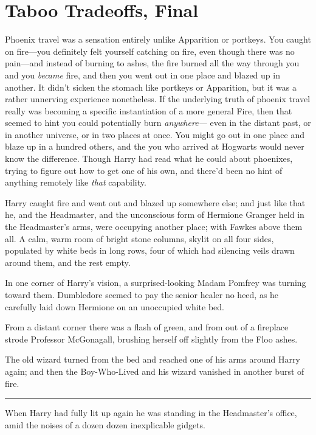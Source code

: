 \chapter{Taboo Tradeoffs, Final}

Phoenix travel was a sensation entirely unlike Apparition or portkeys.
You caught on fire---you definitely felt yourself catching on fire, even
though there was no pain---and instead of burning to ashes, the fire
burned all the way through you and you \emph{became} fire, and then you
went out in one place and blazed up in another. It didn't sicken the
stomach like portkeys or Apparition, but it was a rather unnerving
experience nonetheless. If the underlying truth of phoenix travel really
was becoming a specific instantiation of a more general Fire, then that
seemed to hint you could potentially burn \emph{anywhere---} even in the
distant past, or in another universe, or in two places at once. You
might go out in one place and blaze up in a hundred others, and the you
who arrived at Hogwarts would never know the difference. Though Harry
had read what he could about phoenixes, trying to figure out how to get
one of his own, and there'd been no hint of anything remotely like
\emph{that} capability.

Harry caught fire and went out and blazed up somewhere else; and just
like that he, and the Headmaster, and the unconscious form of Hermione
Granger held in the Headmaster's arms, were occupying another place;
with Fawkes above them all. A calm, warm room of bright stone columns,
skylit on all four sides, populated by white beds in long rows, four of
which had silencing veils drawn around them, and the rest empty.

In one corner of Harry's vision, a surprised-looking Madam Pomfrey was
turning toward them. Dumbledore seemed to pay the senior healer no heed,
as he carefully laid down Hermione on an unoccupied white bed.

From a distant corner there was a flash of green, and from out of a
fireplace strode Professor McGonagall, brushing herself off slightly
from the Floo ashes.

The old wizard turned from the bed and reached one of his arms around
Harry again; and then the Boy-Who-Lived and his wizard vanished in
another burst of fire.

\begin{center}\rule{3in}{0.4pt}\end{center}

When Harry had fully lit up again he was standing in the Headmaster's
office, amid the noises of a dozen dozen inexplicable gidgets.

